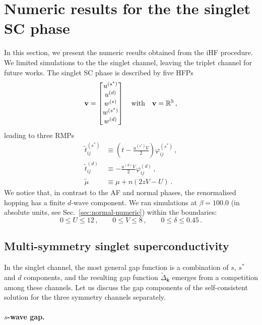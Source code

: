 \section{Numeric results for the the singlet SC phase}\label{sec:sc-numeric}

In this section, we present the numeric results obtained from the iHF procedure. We limited simulations to the the singlet channel, leaving the triplet channel for future works. The singlet SC phase is described by five HFPs
\[
	\mathbf{v} = \begin{bmatrix}
		u^{(s^*)} \\ u^{(d)} \\ w^{(s)} \\ w^{(s^*)} \\ w^{(d)}
	\end{bmatrix}
	\qq{with}
	\mathbf{v} = \mathbb{R}^5 \, ,
\]
leading to three RMPs
\[
\begin{aligned}
	\tilde{t}_{ij}^{(s^*)} &\equiv \left(
	t - \frac{u^{(s^*)}V}{2}
	\right) \varphi_{ij}^{(s^*)} \, , \\
	\tilde{t}_{ij}^{(d)} &\equiv - \frac{u^{(d)}V}{2} \varphi_{ij}^{(d)} \, , \\
	\tilde{\mu} &\equiv \mu + n (2zV-U) \, .
\end{aligned}
\]
We notice that, in contrast to the AF and normal phases, the renormalised hopping has a finite $d$-wave component. We ran simulations at $\beta=100.0$ (in absolute units, see Sec.~\ref{sec:normal-numeric}) within the boundaries:
\[
	0 \le U \le 12 \, ,
	\qquad
	0 \le V \le 8 \, ,
	\qquad
	0 \le \delta \le 0.45 \, .
\]

\subsection{Multi-symmetry singlet superconductivity}

In the singlet channel, the most general gap function is a combination of $s$, $s^*$ and $d$ components, and the resulting gap function $\tilde{\Delta}_{\mathbf{k}}$ emerges from a competition among these channels. Let us discuss the gap components of the self-consistent solution for the three symmetry channels separately.

\paragraph{$s$-wave gap.}

